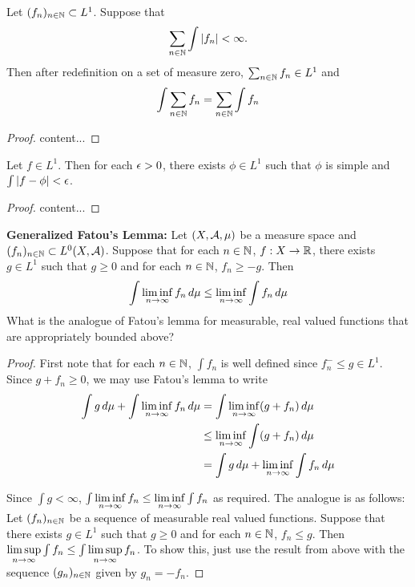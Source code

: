 \documentclass{book}
\begin{document}
	\begin{ex} 
		Let $(f_n)_{n \in \mathbb{N}} \subset L^1$. Suppose that $$\sum_{n \in \mathbb{N}} \int |f_n| < \infty.$$ Then after redefinition on a set of measure zero, $\sum_{n \in \mathbb{N}}f_n \in L^1$ and $$\int \sum_{n \in \mathbb{N}}f_n = \sum_{n \in \mathbb{N}} \int f_n$$
	\end{ex}

	\begin{proof}
		content...
	\end{proof}
	
	\begin{ex} 
		Let $f \in L^1$. Then for each $\epsilon > 0$, there exists $\phi \in L^1$ such that $\phi$ is simple and $\int |f - \phi| < \epsilon$.  
	\end{ex}

	\begin{proof}
		content...
	\end{proof}
	
	\begin{ex}  \textbf{Generalized Fatou's Lemma:}
		Let $(X, \mathcal{A}, \mu)$ be a measure space and $(f_n)_{n \in \mathbb{N}} \subset L^0(X, \mathcal{A})$. Suppose that for each $n \in \mathbb{N}$, $f:X \rightarrow \mathbb{R}$, there exists $g \in L^1$ such that $g \geq 0$ and for each $n \in \mathbb{N}$, $f_n \geq -g$. Then 
		$$ \int \liminf \limits_{n \rightarrow \infty} f_n \, d \mu \leq \liminf \limits_{n \rightarrow \infty} \int f_n \, d \mu $$ 
		What is the analogue of Fatou's lemma for measurable, real valued functions that are appropriately bounded above?  
	\end{ex}
	
	\begin{proof}
		First note that for each $n \in \mathbb{N}$, $\int f_n$ is well defined since $f_n^- \leq g \in L^1$. Since $g + f_n \geq 0$, we may use Fatou's lemma to write
		\begin{align*}
			\int g \, d \mu + \int \liminf \limits_{n \rightarrow \infty} f_n \, d \mu 
			&= \int \liminf \limits_{n \rightarrow \infty} (g+f_n)  \, d \mu \\
			& \leq \liminf \limits_{n \rightarrow \infty} \int (g + f_n) \, d \mu \\
			&= \int g \, d \mu + \liminf \limits_{n \rightarrow \infty} \int f_n \, d \mu 
		\end{align*}
		
		Since $\int g < \infty$, $\int \liminf \limits_{n \rightarrow \infty} f_n \leq \liminf \limits_{n \rightarrow \infty} \int f_n$ as required. The analogue is as follows: Let $(f_n)_{n \in \mathbb{N}}$ be a sequence of measurable real valued functions. Suppose that there exists $g \in L^1$ such that $g \geq 0$ and for each $n \in \mathbb{N}$, $f_n \leq g$. Then $\limsup \limits_{n \rightarrow \infty} \int f_n \leq \int \limsup \limits_{n \rightarrow \infty} f_n$. To show this, just use the result from above with the sequence $(g_n)_{n \in \mathbb{N}}$ given by $g_n = -f_n$.
		
	\end{proof}
	
\end{document}
